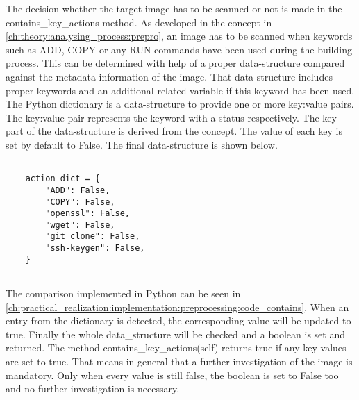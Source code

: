 The decision whether the target image has to be scanned or not is made in the contains\_key\_actions method. 
As developed in the concept in \ref{ch:theory:analysing_process:prepro}, an image has to be scanned when keywords such as ADD, COPY or any RUN commands have been used during the building process.
This can be determined with help of a proper data-structure compared against the metadata information of the image.
That data-structure includes proper keywords and an additional related variable if this keyword has been used.
The Python dictionary is a data-structure to provide one or more key:value pairs. The key:value pair represents the keyword with a status respectively.
The key part of the data-structure is derived from the concept. The value of each key is set by default to False. The final data-structure is shown below.
\lstset{language=Python}          %
\begin{lstlisting}[]  % Start your code-block
	
    action_dict = {
        "ADD": False,
        "COPY": False,
        "openssl": False,
        "wget": False,
        "git clone": False,
        "ssh-keygen": False,
    }
    
\end{lstlisting}
The comparison implemented in Python can be seen in \ref{ch:practical_realization:implementation:preprocessing:code_contains}. When an entry from the dictionary is detected, the corresponding value will be updated to true.
Finally the whole data\_structure will be checked and a boolean is set and returned. The method contains\_key\_actions(self) returns true if any key values are set to true. That means in general that a further investigation of the image is mandatory. Only when every value is still false, the boolean is set to False too and no further investigation is necessary.


